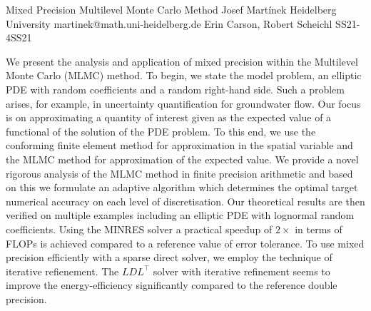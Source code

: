 \begin{talk}
  {Mixed Precision Multilevel Monte Carlo Method}%
  {Josef Martínek}%
  {Heidelberg University}%
  {martinek@math.uni-heidelberg.de}%
  {Erin Carson, Robert Scheichl}%
{}{}{SS21-4}{SS21}

			
We present the analysis and application of mixed precision within the Multilevel Monte Carlo (MLMC) method. To begin, we state the model problem, an elliptic PDE with random coefficients and a random right-hand side. Such a problem arises, for example, in uncertainty quantification for groundwater flow. Our focus is on approximating a quantity of interest given as the expected value of a functional of the solution of the PDE problem. To this end, we use the conforming finite element method for approximation in the spatial variable and the MLMC method for approximation of the expected value. We provide a novel rigorous analysis of the MLMC method in finite precision arithmetic and based on this we formulate an adaptive algorithm which determines the optimal target numerical accuracy on each level of discretisation. Our theoretical results are then verified on multiple examples including an elliptic PDE with lognormal random coefficients. Using the MINRES solver a practical speedup of $2\times$ in terms of FLOPs is achieved compared to a reference value of error tolerance. To use mixed precision efficiently with a sparse direct solver, we employ the technique of iterative refienement. The $LDL^\top$ solver with iterative refinement seems to improve the energy-efficiency significantly compared to the reference double precision.

\end{talk}

